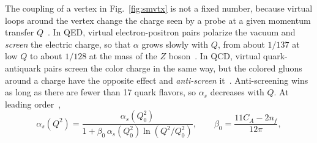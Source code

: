 The coupling of a vertex in Fig.~\ref{fig:smvtx} is not a fixed number, because virtual loops around the vertex change the charge seen by a probe at a given momentum transfer \(Q\)~\cite{peskin2018introduction}.
%
In QED, virtual electron-positron pairs polarize the vacuum and \emph{screen} the electric charge, so that \(\alpha\) grows slowly with \(Q\), from about \(1/137\) at low \(Q\) to about \(1/128\) at the mass of the \(Z\) boson~\cite{ParticleDataGroup:2026aaa}.
%
In QCD, virtual quark-antiquark pairs screen the color charge in the same way, but the colored gluons around a charge have the opposite effect and \emph{anti-screen} it~\cite{PhysRevLett.30.1343,PhysRevLett.30.1346}.
%
Anti-screening wins as long as there are fewer than 17 quark flavors, so \(\alpha_s\) decreases with \(Q\).
%
At leading order~\cite{ParticleDataGroup:2026aaa},
\begin{equation}
	\alpha_s(Q^2) = \frac{\alpha_s(Q_0^2)}{1 + \beta_0\,\alpha_s(Q_0^2)\ln(Q^2/Q_0^2)}, \qquad \beta_0 = \frac{11 C_A - 2 n_f}{12\pi},
	\label{eq:alphasVsQ2}
\end{equation}

